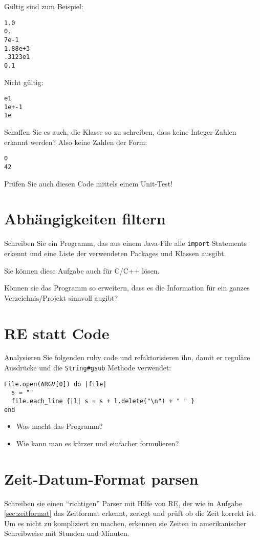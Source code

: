 \documentclass[a4paper,11pt,oneside]{scrbook}
\begin{document}
Gültig sind zum Beispiel:
\begin{lstlisting}
1.0
0.
7e-1
1.88e+3
.3123e1
0.1
\end{lstlisting}

Nicht gültig:
\begin{lstlisting}
e1
1e+-1
1e
\end{lstlisting}

Schaffen Sie es auch, die Klasse so zu schreiben, dass keine Integer-Zahlen erkannt werden? Also keine Zahlen der Form:
\begin{lstlisting}
0
42
\end{lstlisting}

Prüfen Sie auch diesen Code mittels einem Unit-Test!


\section{Abhängigkeiten filtern} %
\label{sec:anhängigkeiten_filtern}
Schreiben Sie ein Programm, das aus einem Java-File alle \texttt{import} Statements erkennt und eine Liste der verwendeten Packages und Klassen ausgibt.

Sie können diese Aufgabe auch für C/C++ lösen.

Können sie das Programm so erweitern, dass es die Information für ein ganzes Verzeichnis/Projekt sinnvoll augibt?


\section{RE statt Code} %
\label{sec:re_statt_code}
Analysieren Sie folgenden ruby code und refaktorisieren ihn, damit er reguläre Ausdrücke und die \texttt{String\#gsub} Methode verwendet:

\begin{lstlisting}
File.open(ARGV[0]) do |file|
  s = ""
  file.each_line {|l| s = s + l.delete("\n") + " " } 
end
\end{lstlisting}

\begin{itemize}
	\item Was macht das Programm?
	\item Wie kann man es kürzer und einfacher formulieren?
\end{itemize}



\section{Zeit-Datum-Format parsen} %
\label{sec:zeit_datum_format_parsen}
Schreiben sie einen “richtigen” Parser mit Hilfe von RE, der wie in Aufgabe \ref{sec:zeitformat} das Zeitformat erkennt, zerlegt und prüft ob die Zeit korrekt ist. Um es nicht zu kompliziert zu machen, erkennen sie Zeiten in amerikanischer Schreibweise mit Stunden und Minuten.
\end{document}
